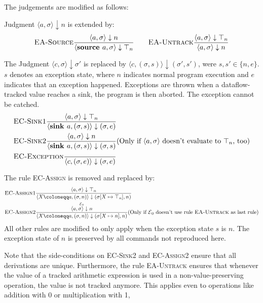 The judgements are modified as follows:

Judgment $\langle a, \sigma \rangle \downarrow n$ is extended by:
\begin{align*}
    \textsc{EA-Source}\frac{\displaystyle \langle a, \sigma \rangle \downarrow n}{\displaystyle \langle \textbf{source }a, \sigma \rangle \downarrow \top_n}
    \qquad     
    \textsc{EA-Untrack}\frac{\displaystyle \langle a, \sigma \rangle \downarrow \top_n}{\displaystyle \langle a, \sigma \rangle \downarrow n}
\end{align*}




The Judgment $\langle c, \sigma \rangle \downarrow \sigma'$ is replaced by 
$\langle c, (\sigma, s) \rangle \downarrow (\sigma', s')$, were $s, s' \in \{n, e\}$.
$s$ denotes an exception state, where $n$ indicates normal program execution and $e$
indicates that an exception happened.
Exceptions are thrown when a dataflow-tracked value reaches a sink, the program
is then aborted. The exception cannot be catched.
\begin{align*}
    &\textsc{EC-Sink1}
    \frac{\displaystyle \langle a, \sigma \rangle\downarrow \top_n}{\displaystyle \langle \textbf{sink } a, (\sigma, s) \rangle \downarrow (\sigma, e)}\\
    &\textsc{EC-Sink2}\frac{\displaystyle \langle a, \sigma\rangle \downarrow n}{\displaystyle \langle \textbf{sink } a, (\sigma, s) \rangle \downarrow (\sigma, s)}
    (\text{Only if $\langle a, \sigma\rangle$ doesn't evaluate to $\top_n$, too})\\
    &\textsc{EC-Exception}\frac{\displaystyle }{\displaystyle \langle c, (\sigma, e) \rangle \downarrow (\sigma, e)}
\end{align*}

The rule \textsc{EC-Assign} is removed and replaced by:
\begin{align*}
    &\textsc{EC-Assign1}\ddfrac{\langle a, \sigma\rangle \downarrow \top_n}
    {\langle X \coloneqq a, (\sigma, n) \rangle \downarrow (\sigma[X \mapsto \top_n], n)}\\
    &\textsc{EC-Assign2}\ddfrac{\overset{\E_0}{\langle a, \sigma \rangle \downarrow n}}
    {\langle X \coloneqq a, (\sigma, n) \rangle \downarrow (\sigma[X \mapsto n], n)}
     (\text{Only if $\E_0$ doesn't use rule \textsc{EA-Untrack} as last rule})
\end{align*}
All other rules are modified to only apply when the exception state $s$ is $n$.
The exception state of $n$ is preserved by all commands not reproduced here.

Note that the side-conditions on \textsc{EC-Sink2} and \textsc{EC-Assign2}
ensure that all derivations are unique.
Furthermore, the rule \textsc{EA-Untrack} ensures that whenever the value of
a tracked arithmetic expression is used in a non-value-preserving operation,
the value is not tracked anymore.
This applies even to operations like addition with 0 or multiplication with 1,

